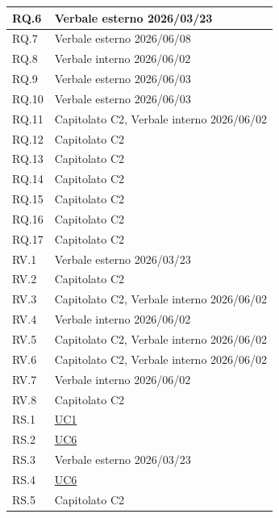 \documentclass[12pt, a4paper]{article}
\begin{document}
\begin{longtable}{|l|p{}|}
RQ.6 & Verbale esterno 2026/03/23 \\ \hline
RQ.7 & Verbale esterno 2026/06/08 \\ \hline
RQ.8 & Verbale interno 2026/06/02 \\ \hline
RQ.9 & Verbale esterno 2026/06/03 \\ \hline
RQ.10 & Verbale esterno 2026/06/03 \\ \hline
RQ.11 & Capitolato C2, Verbale interno 2026/06/02 \\ \hline
RQ.12 & Capitolato C2 \\ \hline
RQ.13 & Capitolato C2 \\ \hline
RQ.14 & Capitolato C2 \\ \hline
RQ.15 & Capitolato C2 \\ \hline
RQ.16 & Capitolato C2 \\ \hline
RQ.17 & Capitolato C2 \\ \hline
RV.1 & Verbale esterno 2026/03/23 \\ \hline
RV.2 & Capitolato C2 \\ \hline
RV.3 & Capitolato C2, Verbale interno 2026/06/02 \\ \hline
RV.4 & Verbale interno 2026/06/02 \\ \hline
RV.5 & Capitolato C2, Verbale interno 2026/06/02 \\ \hline
RV.6 & Capitolato C2, Verbale interno 2026/06/02 \\ \hline
RV.7 & Verbale interno 2026/06/02 \\ \hline
RV.8 & Capitolato C2 \\ \hline
RS.1 & \hyperref[uc:1]{UC1} \\ \hline
RS.2 & \hyperref[uc:6]{UC6} \\ \hline
RS.3 & Verbale esterno 2026/03/23 \\ \hline
RS.4 & \hyperref[uc:6]{UC6} \\ \hline
RS.5 & Capitolato C2 \\ \hline

\end{longtable}
\end{document}
